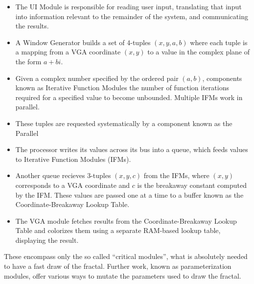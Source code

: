 \documentclass{article}
\begin{document}
\begin{itemize}
\item The UI Module is responsible for reading user input, translating
  that input into information relevant to the remainder of the system,
  and communicating the results.
\item A Window Generator builds a set of 4-tuples $(x, y, a, b)$ where
  each tuple is a mapping from a VGA coordinate $(x, y)$ to a value in
  the complex plane of the form $a+bi$.
\item Given a complex number specified by the ordered pair $(a, b)$,
  components known as Iterative Function Modules the number of
  function iterations required for a specified value to become
  unbounded. Multiple IFMs work in parallel.

\item These tuples are requested systematically by a component known
  as the Parallel


\item The processor writes its values across its bus into a queue,
  which feeds values to Iterative Function Modules (IFMs).

\item Another queue recieves 3-tuples $(x, y, c)$ from the IFMs, where
  $(x, y)$ corresponds to a VGA coordinate and $c$ is the breakaway
  constant computed by the IFM. These values are passed one at a time
  to a buffer known as the Coordinate-Breakaway Lookup Table.
\item The VGA module fetches results from the Coordinate-Breakaway
  Lookup Table and colorizes them using a separate RAM-based lookup
  table, displaying the result.
\end{itemize}

These encompass only the so called ``critical modules'', what is
absolutely needed to have a fast draw of the fractal. Further work,
known as parameterization modules, offer various ways to mutate the
parameters used to draw the fractal.

\newpage
\end{document}
